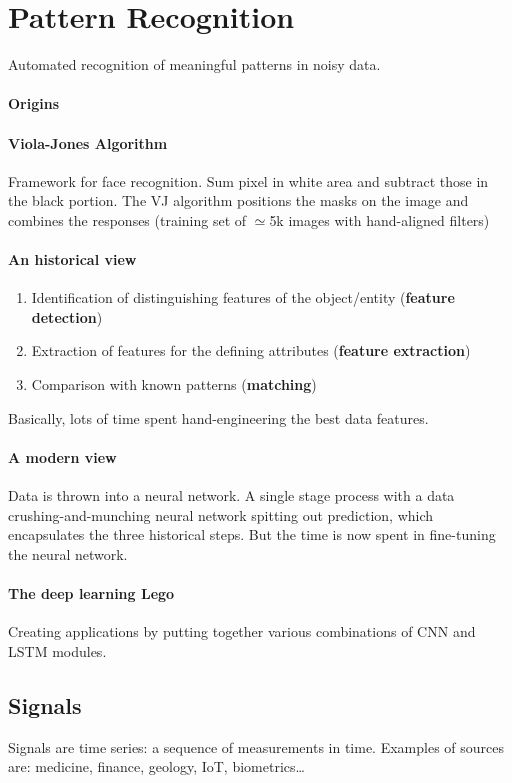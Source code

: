 \documentclass[10pt]{report}
\begin{document}
\section{Pattern Recognition}
Automated recognition of meaningful patterns in noisy data.
\paragraph{Origins} 
\paragraph{Viola-Jones Algorithm} Framework for face recognition. Sum pixel in white area and subtract those in the black portion. The VJ algorithm positions the masks on the image and combines the responses (training set of $\simeq$5k images with hand-aligned filters)
\paragraph{An historical view} \begin{enumerate}
	\item Identification of distinguishing features of the object/entity (\textbf{feature detection})
	\item Extraction of features for the defining attributes (\textbf{feature extraction})
	\item Comparison with known patterns (\textbf{matching})
\end{enumerate}
Basically, lots of time spent hand-engineering the best data features.
\paragraph{A modern view}
Data is thrown into a neural network. A single stage process with a data crushing-and-munching neural network spitting out prediction, which encapsulates the three historical steps. But the time is now spent in fine-tuning the neural network.
\paragraph{The deep learning Lego} Creating applications by putting together various combinations of CNN and LSTM modules.
\subsection{Signals}
Signals are time series: a sequence of measurements in time. Examples of sources are: medicine, finance, geology, IoT, biometrics\ldots
\end{document}
